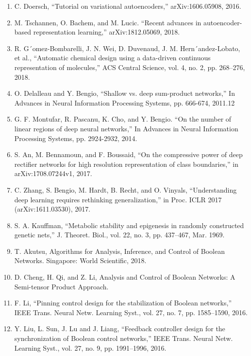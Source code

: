 \documentclass{article}
\begin{document}
\begin{enumerate}
	\item C. Doersch, “Tutorial on variational autoencoders,” arXiv:1606.05908, 2016.

	\item M. Tschannen, O. Bachem, and M. Lucic. “Recent advances in autoencoder-based representation learning,” arXiv:1812.05069, 2018.

	\item R. G´omez-Bombarelli, J. N. Wei, D. Duvenaud, J. M. Hern´andez-Lobato, et al., “Automatic	chemical design using a data-driven continuous representation of molecules,” ACS Central
	Science, vol. 4, no. 2, pp. 268–276, 2018.

	\item O. Delalleau and Y. Bengio, “Shallow vs. deep sum-product networks,” In Advances in Neural
	Information Processing Systems, pp. 666-674, 2011.12

	\item G. F. Montufar, R. Pascanu, K. Cho, and Y. Bengio. “On the number of linear regions of
	deep neural networks,” In Advances in Neural Information Processing Systems, pp. 2924-2932, 2014.

	\item S. An, M. Bennamoun, and F. Boussaid, “On the compressive power of deep rectifier networks
	for high resolution representation of class boundaries,” in arXiv:1708.07244v1, 2017.

	\item C. Zhang, S. Bengio, M. Hardt, B. Recht, and O. Vinyals, “Understanding deep learning
	requires rethinking generalization,” in Proc. ICLR 2017 (arXiv:1611.03530), 2017.

	\item S. A. Kauffman, “Metabolic stability and epigenesis in randomly constructed genetic nets,” J.
	Theoret. Biol., vol. 22, no. 3, pp. 437–467, Mar. 1969.

	\item T. Akutsu, Algorithms for Analysis, Inference, and Control of Boolean Networks. Singapore: World Scientific, 2018.

	\item D. Cheng, H. Qi, and Z. Li, Analysis and Control of Boolean Networks: A Semi-tensor Product Approach.

	\item F. Li, “Pinning control design for the stabilization of Boolean networks,” IEEE Trans. Neural Netw. Learning Syst., vol. 27, no. 7, pp. 1585–1590, 2016.

	\item Y. Liu, L. Sun, J. Lu and J. Liang, “Feedback controller design for the synchronization of Boolean control networks,” IEEE Trans. Neural Netw. Learning Syst., vol. 27, no. 9, pp. 1991–1996, 2016.


\end{enumerate}
\end{document}
